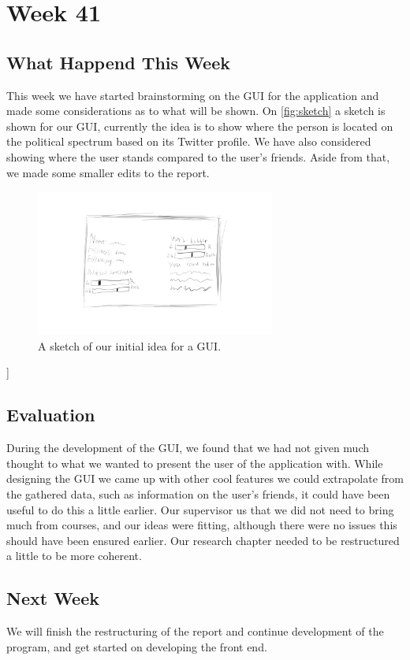 \section*{Week 41} 
\subsection*{What Happend This Week}
This week we have started brainstorming on the \ac{GUI} for the application and
made some considerations as to what will be shown. On \autoref{fig:sketch} a
sketch is shown for our \ac{GUI}, currently the idea is to show where the person is
located on the political spectrum based on its Twitter profile. We have also
considered showing where the user stands compared to the user's friends. Aside
from that, we made some smaller edits to the report.

\begin{figure}[H] 
	\centering 
	\includegraphics[width = 0.7\textwidth]{figures/guisketch2.png}
	\caption{A sketch of our initial idea for a \ac{GUI}.}
	\label{fig:sketch}
\end{figure}]

\subsection*{Evaluation} 
During the development of the \ac{GUI}, we found that
we had not given much thought to what we wanted to present the user of the
application with. While designing the \ac{GUI} we came up with other cool
features we could extrapolate from the gathered data, such as information on the
user's friends, it could have been useful to do this a little earlier. Our
supervisor us that we did not need to bring much from courses, and our ideas
were fitting, although there were no issues this should have been ensured
earlier. Our research chapter needed to be restructured a little to be more
coherent.


\subsection*{Next Week}
We will finish the restructuring of the report and continue development of the
program, and get started on developing the front end.



% 
% 
% 
